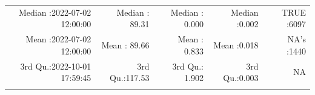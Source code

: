\documentclass[
  10pt,
  a4paper,oneside]{article}
\begin{document}
\begin{longtable}[]{@{}rrrrr@{}}
\begin{minipage}[t]{0.27\columnwidth}\raggedleft
Median :2022-07-02 12:00:00\strut
\end{minipage} & \begin{minipage}[t]{0.15\columnwidth}\raggedleft
Median : 89.31\strut
\end{minipage} & \begin{minipage}[t]{0.15\columnwidth}\raggedleft
Median : 0.000\strut
\end{minipage} & \begin{minipage}[t]{0.14\columnwidth}\raggedleft
Median :0.002\strut
\end{minipage} & \begin{minipage}[t]{0.14\columnwidth}\raggedleft
TRUE :6097\strut
\end{minipage}\tabularnewline
\begin{minipage}[t]{0.27\columnwidth}\raggedleft
Mean :2022-07-02 12:00:00\strut
\end{minipage} & \begin{minipage}[t]{0.15\columnwidth}\raggedleft
Mean : 89.66\strut
\end{minipage} & \begin{minipage}[t]{0.15\columnwidth}\raggedleft
Mean : 0.833\strut
\end{minipage} & \begin{minipage}[t]{0.14\columnwidth}\raggedleft
Mean :0.018\strut
\end{minipage} & \begin{minipage}[t]{0.14\columnwidth}\raggedleft
NA's :1440\strut
\end{minipage}\tabularnewline
\begin{minipage}[t]{0.27\columnwidth}\raggedleft
3rd Qu.:2022-10-01 17:59:45\strut
\end{minipage} & \begin{minipage}[t]{0.15\columnwidth}\raggedleft
3rd Qu.:117.53\strut
\end{minipage} & \begin{minipage}[t]{0.15\columnwidth}\raggedleft
3rd Qu.: 1.902\strut
\end{minipage} & \begin{minipage}[t]{0.14\columnwidth}\raggedleft
3rd Qu.:0.003\strut
\end{minipage} & \begin{minipage}[t]{0.14\columnwidth}\raggedleft
NA\strut
\end{minipage}\tabularnewline
\begin{minipage}[t]{0.27\columnwidth}\raggedleft

\end{minipage}
\end{longtable}
\end{document}
